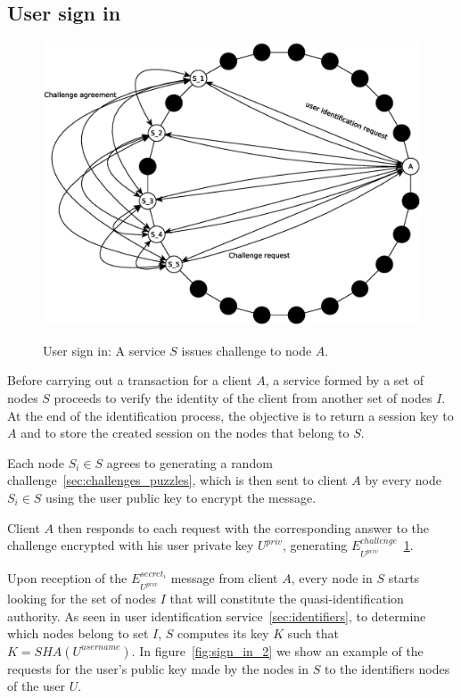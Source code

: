 \subsection{User sign in}
\begin{figure}[!htb]
\centering
\includegraphics[width=14cm]{../img/sign_in}\\
\caption{User sign in: A service $S$ issues challenge to node $A$.}
\label{fig:sign_in}
\end{figure}

Before carrying out a transaction for a client $A$, a service formed by a set of nodes $S$ proceeds to
verify the identity of the client from another set of nodes $I$. At the end of
the identification process, the objective is to return a session key to $A$
and to store the created session on the nodes that belong to $S$.

Each node $S_i \in S$ agrees to generating a random challenge~\ref{sec:challenges_puzzles}, which is then sent to
client $A$ by every node $S_i \in S$ using the user public key to encrypt the
message.

Client $A$ then responds to each request with the corresponding answer to the
challenge encrypted with his user private key $U^{priv}$, generating
$E^{challenge}_{U^{priv}}$~\ref{fig:sign_in}. 

Upon reception of the $E^{secret_i}_{U^{priv}}$ message from client $A$, every node in $S$
starts looking for the set of nodes $I$ that will constitute the
quasi-identification authority. As seen in user identification
service~\ref{sec:identifiers}, to determine which nodes belong to set $I$, $S$ computes
its key $K$ such that $K = SHA(U^{username})$. In figure~\ref{fig:sign_in_2} we
show an example of the requests for the user's public key made by the nodes in $S$ to the
identifiers nodes of the user $U$.

